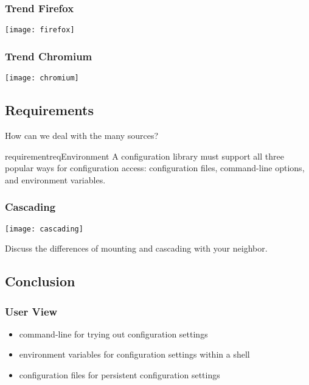 \documentclass{beamer}
\begin{document}
\begin{frame}
	\frametitle{Trend Firefox}
	\texttt{[image: firefox]}
\end{frame}

\begin{frame}
	\frametitle{Trend Chromium}
	\texttt{[image: chromium]}
\end{frame}

\subsection{Requirements}

\begin{frame}
	How can we deal with the many sources?

	\vspace{1cm}

	\begin{restatable}{requirement}{reqEnvironment}
	A configuration library must support all three popular ways for configuration access:
	configuration files, command-line options, and environment variables.
	\end{restatable}
\end{frame}

\begin{frame}
	\frametitle{Cascading}
	\texttt{[image: cascading]}
\end{frame}

\begin{assignment}
	\begin{task}
	Discuss the differences of mounting and cascading with your neighbor.
	\end{task}
\end{assignment}

\subsection{Conclusion}

\begin{frame}
	\frametitle{User View}
	\begin{itemize}
	\item command-line for trying out configuration settings
	\item environment variables for configuration settings within a shell
	\item configuration files for persistent configuration settings
	\end{itemize}
\end{frame}
\end{document}
